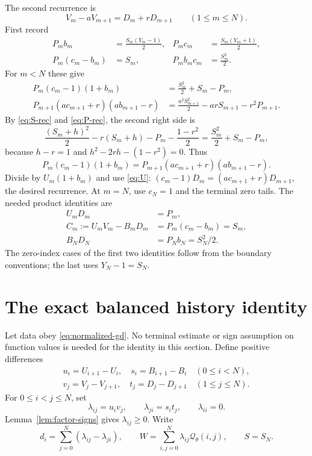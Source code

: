 \documentclass[11pt]{article}
\numberwithin{equation}{section}
\theoremstyle{remark}
\newcommand{\Q}{\mathcal Q}
\begin{document}
The second recurrence is
\begin{equation}
V_m-aV_{m+1}=D_m+rD_{m+1}\qquad(1\leq m\leq N).
\label{eq:reverse-recurrence}
\end{equation}
First record
\begin{align}
P_mb_m&=\frac{S_m(Y_m-1)}2,&
P_mc_m&=\frac{S_m(Y_m+1)}2,\label{eq:PbPc}\\
P_m(c_m-b_m)&=S_m,& P_mb_mc_m&=\frac{S_m^2}2.
\label{eq:ratio-products}
\end{align}
For $m<N$ these give
\begin{align}
P_m(c_m-1)(1+b_m)
&=\frac{S_m^2}2+S_m-P_m,\label{eq:tail-left}\\
P_{m+1}(ac_{m+1}+r)(ab_{m+1}-r)
&=\frac{a^2S_{m+1}^2}2-arS_{m+1}-r^2P_{m+1}.
\label{eq:tail-right}
\end{align}
By \eqref{eq:S-rec} and \eqref{eq:P-rec}, the second right side is
\[
\frac{(S_m+h)^2}{2}-r(S_m+h)-P_m-\frac{1-r^2}{2}
=\frac{S_m^2}{2}+S_m-P_m,
\]
because $h-r=1$ and $h^2-2rh-(1-r^2)=0$. Thus
\[
P_m(c_m-1)(1+b_m)
=P_{m+1}(ac_{m+1}+r)(ab_{m+1}-r).
\]
Divide by $U_m(1+b_m)$ and use \eqref{eq:U}:
$(c_m-1)D_m=(ac_{m+1}+r)D_{m+1}$, the desired recurrence.
At $m=N$, use $c_N=1$ and the terminal zero tails.
The needed product identities are
\begin{align}
U_mD_m&=P_m,\label{eq:UD}\\
C_m:=U_mV_m-B_mD_m&=P_m(c_m-b_m)=S_m,\label{eq:C}\\
B_ND_N&=P_Nb_N=S_N^2/2.\label{eq:terminal-BD}
\end{align}
The zero-index cases of the first two identities follow from the
boundary conventions; the last uses $Y_N-1=S_N$.



\section{The exact balanced history identity}

Let data obey \eqref{eq:normalized-gd}. No terminal estimate or sign
assumption on function values is needed for the identity in this section.
Define positive differences
\begin{equation}
\begin{gathered}
u_i=U_{i+1}-U_i,\quad s_i=B_{i+1}-B_i\quad(0\leq i<N),\\
v_j=V_j-V_{j+1},\quad t_j=D_j-D_{j+1}\quad(1\leq j\leq N).
\end{gathered}
\label{eq:factor-differences}
\end{equation}
For $0\leq i<j\leq N$, set
\begin{equation}
\lambda_{ij}=u_iv_j,\qquad \lambda_{ji}=s_it_j,\qquad\lambda_{ii}=0.
\label{eq:multipliers}
\end{equation}
Lemma~\ref{lem:factor-signs} gives $\lambda_{ij}\geq0$. Write
\begin{equation}
d_i=\sum_{j=0}^N(\lambda_{ij}-\lambda_{ji}),\qquad
W=\sum_{i,j=0}^N\lambda_{ij}\Q_\theta(i,j),\qquad S=S_N.
\label{eq:W}
\end{equation}
\end{document}
